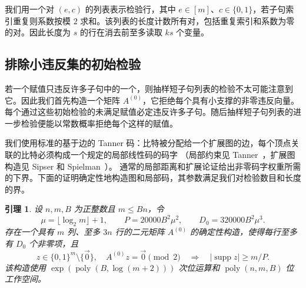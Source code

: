 \documentclass[11pt,reqno]{amsart}
\numberwithin{equation}{section}
\newtheorem{lemma}[theorem]{引理}
\theoremstyle{definition}\newtheorem{definition}[theorem]{定义}
\theoremstyle{remark}\newtheorem{remark}[theorem]{注}
\newcommand{\poly}{\operatorname{poly}}
\renewcommand{\le}{\leqslant}
\renewcommand{\ge}{\geqslant}
\begin{document}
我们用一个对 $(e,c)$ 的列表表示检验行，其中 $e\in[m]$、$c\in\{0,1\}$，若子句索引重复则系数按模 $2$ 求和。该列表的长度计数所有对，包括重复索引和系数为零的对。因此长度为 $s$ 的行在消去前至多读取 $ks$ 个变量。

\subsection{排除小违反集的初始检验}

若一个赋值只违反许多子句中的一个，则抽样短子句列表的检验不太可能注意到它。因此我们首先构造一个矩阵 $A^{(0)}$，它拒绝每个具有小支撑的非零违反向量。每个通过这些初始检验的未满足赋值必定违反许多子句。随后抽样短子句列表的进一步检验便能以常数概率拒绝每个这样的赋值。

我们使用标准的基于边的 Tanner 码：比特被分配给一个扩展图的边，每个顶点关联的比特必须构成一个规定的局部线性码的码字
（局部约束见
Tanner~\cite[第~II 节]{Tanner81}，扩展图构造见
Sipser 和 Spielman~\cite[第~IV 和~VI 节]{SS96}）。
通常的局部距离和扩展论证给出非零码字权重所需的下界。下面的证明确定性地构造图和局部码，其参数满足我们对检验数目和长度的界。

\begin{lemma}\label{lem:sparse-checks}
设 $n,m,B$ 为正整数且 $m\le Bn$，令
\[
 \mu=\lfloor\log_2 m\rfloor+1,\qquad
 P=20000B^2\mu^2,\qquad D_0=320000B^2\mu^3.
\]
存在一个具有 $m$ 列、至多 $3n$ 行的二元矩阵 $A^{(0)}$ 的确定性构造，使得每行至多有 $D_0$ 个非零项，且
\[
 z\in\{0,1\}^m\setminus\{\vec{0}\},\quad
 A^{(0)}z=\vec{0}\pmod2
 \quad\Longrightarrow\quad
 |\operatorname{supp}z|\ge m/P.
\]
该构造使用 $\exp(\poly(B,\log(m+2)))$ 次位运算和 $\poly(n,m,B)$ 位工作空间。
\end{lemma}
\end{document}
